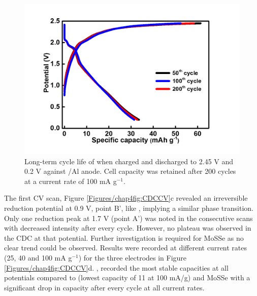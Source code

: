 \begin{figure}[htb!]
\centering
\includegraphics[width=\textwidth]{Figures/chap4fig/mose2}
\caption{Long-term cycle life of  when charged and discharged to 2.45 V and 0.2 V against /Al anode. Cell capacity was retained after 200 cycles at a current rate of 100 mA g$^{-1}$.}
\label{Figures/chap4fig:mose2}
\end{figure}
The first CV scan, Figure \ref{Figures/chap4fig:CDCCV}c revealed an irreversible reduction potential at 0.9 V, point B', like , implying a similar phase transition. Only one reduction peak at 1.7 V (point A') was noted in the consecutive scans with decreased intensity after every cycle. However, no plateau was observed in the CDC at that potential. Further investigation is required for MoSSe as no clear trend could be observed. Results were recorded at different current rates (25, 40 and 100 mA g$^{-1}$) for the three electrodes in Figure \ref{Figures/chap4fig:CDCCV}d. , recorded the most stable capacities at all potentials compared to  (lowest capacity of 11 at 100 mA/g) and MoSSe with a significant drop in capacity after every cycle at all current rates. 
